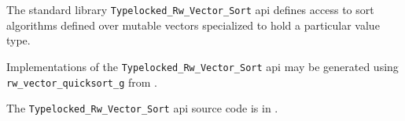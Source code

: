 
The standard library {\tt Typelocked\_Rw\_Vector\_Sort} api defines access to sort algorithms 
defined over mutable vectors specialized to hold a particular value type.

Implementations of the {\tt Typelocked\_Rw\_Vector\_Sort} api may be generated 
using {\tt rw\_vector\_quicksort\_g} from .

The {\tt Typelocked\_Rw\_Vector\_Sort} api source code is in .

